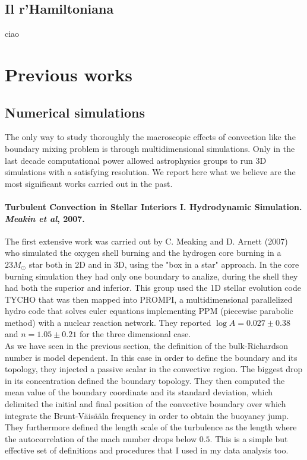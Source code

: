 \documentclass[11pt]{article}
\begin{document}
\subsection{Il r'Hamiltoniana}
ciao


\section{Previous works}

\subsection{Numerical simulations}

The only way to study thoroughly the macroscopic effects of convection like the boundary mixing problem is through multidimensional simulations. Only in the last decade computational power allowed astrophysics groups to run 3D simulations with a satisfying resolution. We report here what we believe are the most significant works carried out in the past. 

\paragraph{Turbulent Convection in Stellar Interiors I. Hydrodynamic Simulation. \textit{Meakin et al}, 2007.} 
The first extensive work was carried out by C. Meaking and D. Arnett (2007) who simulated the oxygen shell burning and the hydrogen core burning in a $23 M_{\odot}$ star both in 2D and in 3D, using the "box in a star" approach. In the core burning simulation they had only one boundary to analize, during the shell they had both the superior and inferior. This group used the 1D stellar evolution code TYCHO that was then mapped into PROMPI, a multidimensional parallelized hydro code that solves euler equations implementing PPM (piecewise parabolic method) with a nuclear reaction network. They reported $\log A=0.027 \pm 0.38$ and $n=1.05 \pm 0.21$ for the three dimensional case. \\
As we have seen in the previous section, the definition of the bulk-Richardson number is model dependent. In this case in order to define the boundary and its topology, they injected a passive scalar in the convective region. The biggest drop in its concentration defined the boundary topology. They then computed the mean value of the boundary coordinate and its standard deviation, which delimited the initial and final position of the convective boundary over which integrate the Brunt-Väisääla frequency in order to obtain the buoyancy jump. They furthermore defined the length scale of the turbulence as the length where the autocorrelation of the mach number drops below $0.5$. This is a simple but effective set of definitions and procedures that I used in my data analysis too. \\
\end{document}
